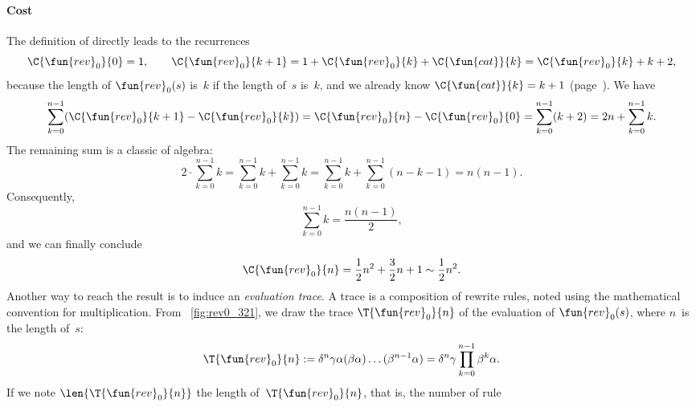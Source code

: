 \paragraph{Cost}
\label{cost:rev0}

The definition of 
directly leads to the recurrences
\begin{equation*}
\C{\fun{rev}_0}{0} = 1,\qquad \C{\fun{rev}_0}{k+1} = 1 +
\C{\fun{rev}_0}{k} + \C{\fun{cat}}{k} = \C{\fun{rev}_0}{k} + k + 2,
\end{equation*}
because the length of \(\fun{rev}_0(s)\) is~\(k\) if the length
of~\(s\) is~\(k\), and we already know \(\C{\fun{cat}}{k} = k +
1\) (page~\pageref{cost:cat}). We have
\begin{equation*}
\sum_{k=0}^{n-1}(\C{\fun{rev}_0}{k+1} - \C{\fun{rev}_0}{k}) =
\C{\fun{rev}_0}{n} - \C{\fun{rev}_0}{0} =
\sum_{k=0}^{n-1}(k+2) = 2n + \sum_{k=0}^{n-1}{k}.
\end{equation*}
The remaining sum is a classic of algebra:
\begin{equation*}
2 \cdot \sum_{k=0}^{n-1}{k} =
\sum_{k=0}^{n-1}{k} + \sum_{k=0}^{n-1}{k} =
\sum_{k=0}^{n-1}{k} + \sum_{k=0}^{n-1}(n-k-1) = n(n-1).
\end{equation*}
Consequently,
\begin{equation}
\sum_{k=0}^{n-1}{k} = \frac{n(n-1)}{2},\label{eq:sum_k}
\end{equation}
and we can finally conclude
\begin{equation*}
\C{\fun{rev}_0}{n} = \frac{1}{2}n^2 + \frac{3}{2}n + 1 \sim \frac{1}{2}n^2.
\end{equation*}
Another way to reach the result is to induce an \emph{evaluation
  trace}. A trace is a
composition of rewrite rules, noted using the mathematical convention
for multiplication. From \fig~\vref{fig:rev0_321}, we draw the trace
\(\T{\fun{rev}_0}{n}\) of the
evaluation of \(\fun{rev}_0(s)\), where
\(n\)~is the length of~\(s\):
\begin{equation*}
\T{\fun{rev}_0}{n} :=
\delta^n\gamma\alpha(\beta\alpha)\dots(\beta^{n-1}\alpha) =
\delta^n\gamma \prod_{k=0}^{n-1}{\beta^k\alpha}.
\end{equation*}
If we note
\(\len{\T{\fun{rev}_0}{n}}\)
the length of~\(\T{\fun{rev}_0}{n}\), that is, the number of rule
